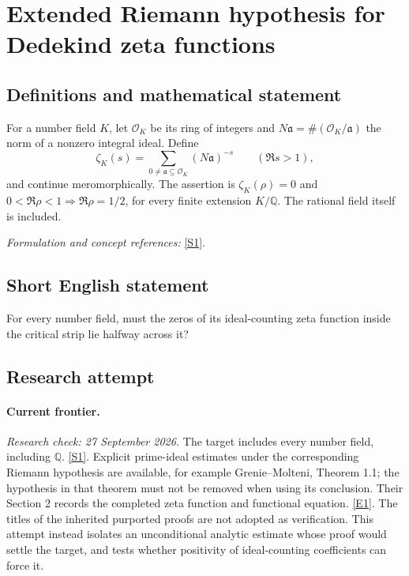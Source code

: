 \documentclass[11pt,a4paper]{article}
\newcommand{\Q}{\mathbb{Q}}
\newcommand{\sref}[2]{\hyperlink{source:#1:#2}{[S#2]}}
\newcommand{\eref}[2]{\hyperlink{extra:#1:#2}{[E#2]}}
\newif\ifshowcatalogue
\newcommand{\cataloguescope}[1]{\ifshowcatalogue
 \paragraph{Exact scope in the supplied catalogue.}
 \begin{quote}\small #1\end{quote}\fi}
\begin{document}
\setcounter{section}{0}
\clearpage
\section*{\texorpdfstring{Extended Riemann hypothesis for Dedekind zeta functions}{Extended Riemann hypothesis for Dedekind zeta functions}}\label{statement}
\subsection{Definitions and mathematical statement}
For a number field $K$, let $\mathcal O_K$ be its ring of integers and $N\mathfrak a=\#(\mathcal O_K/\mathfrak a)$ the norm of a nonzero integral ideal. Define
\[
 \zeta_K(s)=\sum_{0\ne\mathfrak a\subseteq\mathcal O_K}(N\mathfrak a)^{-s}
 \qquad(\Re s>1),
\]
and continue meromorphically. The assertion is $\zeta_K(\rho)=0$ and $0<\Re\rho<1\Rightarrow\Re\rho=1/2$, for every finite extension $K/\Q$. The rational field itself is included.
\par\smallskip\textit{Formulation and concept references:} \sref{statement}{1}.
\cataloguescope{For every algebraic number field K (a finite extension of Q, including K=Q), does every zero s of its Dedekind zeta function \ensuremath{\zeta}\_K(s) in the critical strip 0<Re(s)<1 satisfy Re(s)=1/2?}
\subsection{Short English statement}
For every number field, must the zeros of its ideal-counting zeta function inside the critical strip lie halfway across it?
\subsection{Research attempt}
\paragraph{Current frontier.}
\textit{Research check: 27 September 2026.}
The target includes every number field, including $\Q$.
\sref{statement}{1}. Explicit prime-ideal estimates under the corresponding
Riemann hypothesis are available, for example Grenie--Molteni,
Theorem 1.1; the hypothesis in that theorem must not be removed when
using its conclusion. Their Section 2 records the completed zeta
function and functional equation. \eref{statement}{1}.
The titles of the inherited purported proofs are not adopted as
verification. This attempt instead isolates an unconditional analytic
estimate whose proof would settle the target, and tests whether
positivity of ideal-counting coefficients can force it.
\end{document}
